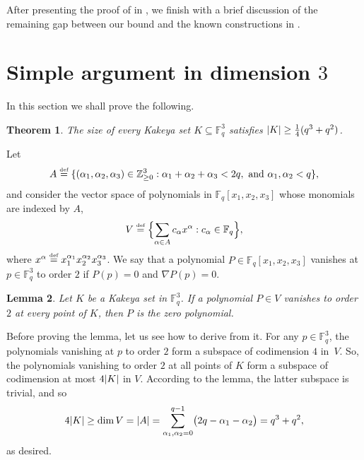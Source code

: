\documentclass{daj}
\newtheorem{theorem}{Theorem}
\newtheorem{lemma}[theorem]{Lemma}
\theoremstyle{definition}
\newcommand*{\eqdef}{\stackrel{\mbox{\normalfont\tiny def}}{=}}   %
\newcommand*{\Znneg}{\mathbb{Z}_{\geq 0}}                          %
\newcommand*{\Fq}{\mathbb{F}_q}                                  %
\DeclarePairedDelimiter\abs{\lvert}{\rvert}                     %
\begin{document}
After presenting the proof of  in ,
we finish with a brief discussion of the remaining gap between our bound
and the known constructions in .

 
\section{Simple argument in dimension \texorpdfstring{$3$}{3}}\label{sec:three}
In this section we shall prove the following.
\begin{theorem}\label{thm:three}
The size of every Kakeya set $K\subseteq \Fq^3$ satisfies $\abs{K}\geq \frac{1}{4}(q^3+q^2)$.
\end{theorem}

Let
\[
  A\eqdef \{(\alpha_1,\alpha_2,\alpha_3)\in\Znneg^3 : \alpha_1+\alpha_2+\alpha_3< 2q,\text{ and } \alpha_1, \alpha_2<q\},
\]
and consider the vector space of polynomials in $\Fq[x_1,x_2,x_3]$ whose monomials are indexed by $A$,
\[
  V\eqdef \Bigl\{\sum_{\alpha\in A} c_{\alpha} x^\alpha : c_\alpha\in \Fq\Bigr\},
\]
where $x^{\alpha}\eqdef x_1^{\alpha_1}x_2^{\alpha_2}x_3^{\alpha_3}$.
We say that a polynomial $P\in \Fq[x_1,x_2,x_3]$ vanishes at $p\in\Fq^3$ to order $2$ if
$P(p)=0$ and $\nabla P(p)=0$.

\begin{lemma}\label{lemma:3dim}
  Let $K$ be a Kakeya set in $\Fq^3$.
  If a polynomial $P\in V$ vanishes to order $2$ at every point of $K$, then $P$ is the zero polynomial.
\end{lemma}


Before proving the lemma, let us see how to derive  from it. For any $p\in \Fq^3$,
the polynomials vanishing at $p$ to order $2$ form a subspace of codimension $4$ in~$V$. So,
the polynomials vanishing to order $2$ at all points of $K$ form a subspace of codimension at most $4\abs{K}$
in $V$. According to the lemma, the latter subspace is trivial, and so
\[
  4\abs{K}\geq \dim V=\abs{A}=\sum_{\alpha_1,\alpha_2=0}^{q-1}\bigl(2q-\alpha_1-\alpha_2\bigr)=q^3+q^2,
\]
as desired.
\end{document}
